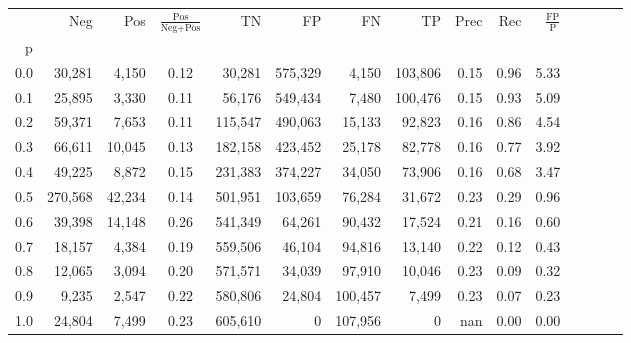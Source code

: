 \begin{tabular}{rrrcrrrrrrrrrrr}
\toprule
{} &      Neg &     Pos & $\frac{\text{Pos}}{\text{Neg}+\text{Pos}}$ &       TN &       FP &       FN &       TP &  Prec &   Rec & $\frac{\text{FP}}{\text{P}}$ \\
p   &          &         &                                            &          &          &          &          &       &       &                              \\
\midrule
0.0 &   30,281 &   4,150 &                                       0.12 &   30,281 &  575,329 &    4,150 &  103,806 &  0.15 &  0.96 &                         5.33 \\
0.1 &   25,895 &   3,330 &                                       0.11 &   56,176 &  549,434 &    7,480 &  100,476 &  0.15 &  0.93 &                         5.09 \\
0.2 &   59,371 &   7,653 &                                       0.11 &  115,547 &  490,063 &   15,133 &   92,823 &  0.16 &  0.86 &                         4.54 \\
0.3 &   66,611 &  10,045 &                                       0.13 &  182,158 &  423,452 &   25,178 &   82,778 &  0.16 &  0.77 &                         3.92 \\
0.4 &   49,225 &   8,872 &                                       0.15 &  231,383 &  374,227 &   34,050 &   73,906 &  0.16 &  0.68 &                         3.47 \\
0.5 &  270,568 &  42,234 &                                       0.14 &  501,951 &  103,659 &   76,284 &   31,672 &  0.23 &  0.29 &                         0.96 \\
0.6 &   39,398 &  14,148 &                                       0.26 &  541,349 &   64,261 &   90,432 &   17,524 &  0.21 &  0.16 &                         0.60 \\
0.7 &   18,157 &   4,384 &                                       0.19 &  559,506 &   46,104 &   94,816 &   13,140 &  0.22 &  0.12 &                         0.43 \\
0.8 &   12,065 &   3,094 &                                       0.20 &  571,571 &   34,039 &   97,910 &   10,046 &  0.23 &  0.09 &                         0.32 \\
0.9 &    9,235 &   2,547 &                                       0.22 &  580,806 &   24,804 &  100,457 &    7,499 &  0.23 &  0.07 &                         0.23 \\
1.0 &   24,804 &   7,499 &                                       0.23 &  605,610 &        0 &  107,956 &        0 &   nan &  0.00 &                         0.00 \\
\bottomrule
\end{tabular}
